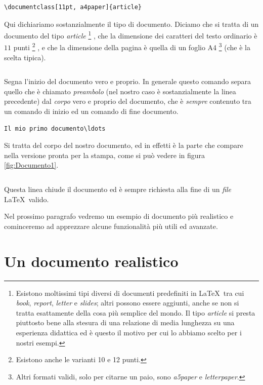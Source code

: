 \begin{verbatim}
\documentclass[11pt, a4paper]{article}
\end{verbatim}
Qui dichiariamo sostanzialmente il tipo di documento. Diciamo che si tratta di
un documento del tipo \emph{article}%
\footnote{
Esistono moltissimi tipi diversi di documenti predefiniti in \LaTeX\, tra cui
\emph{book}, \emph{report}, \emph{letter} e \emph{slides}; altri possono essere
aggiunti, anche se non si tratta esattamente della cosa pi\`u semplice del
mondo. Il tipo \emph{article} si presta piuttosto bene alla stesura di una
relazione di media lunghezza su una esperienza didattica ed \`e questo il
motivo per cui lo abbiamo scelto per i nostri esempi. 
}%
, che la dimensione dei caratteri del testo ordinario \`e $11$ punti%
\footnote{
Esistono anche le varianti 10 e 12 punti.
}%
, e che la dimensione della pagina \`e quella di un foglio A4%
\footnote{
Altri formati validi, solo per citarne un paio, sono \emph{a5paper}
e \emph{letterpaper}.
}
(che \`e la scelta tipica).

\begin{verbatim}

\end{verbatim}
Segna l'inizio del documento vero e proprio. In generale questo comando separa
quello che \`e chiamato \emph{preambolo} (nel nostro caso \`e sostanzialmente
la linea precedente) dal \emph{corpo} vero e proprio del documento, che \`e
\emph{sempre} contenuto tra un comando di inizio ed un comando di fine
documento.

\begin{verbatim}
Il mio primo documento\ldots
\end{verbatim}
Si tratta del corpo del nostro documento, ed in effetti \`e la parte che
compare nella versione pronta per la stampa, come si pu\`o vedere in figura
\ref{fig:Documento1}.

\begin{verbatim}

\end{verbatim}
Questa linea chiude il documento ed \`e sempre richiesta alla fine di un
\emph{file} \LaTeX\ valido.

Nel prossimo paragrafo vedremo un esempio di documento pi\`u realistico e
cominceremo ad apprezzare alcune funzionalit\`a pi\`u utili ed avanzate.


\section{Un documento realistico}
\label{sec:Documento2}

